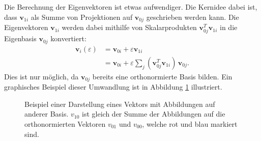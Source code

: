 Die Berechnung der Eigenvektoren ist etwas aufwendiger.
Die Kernidee dabei ist, dass $\bm v_{1i}$ als Summe von Projektionen auf $\bm v_{0j}$ geschrieben werden kann.
Die Eigenvektoren $\bm v_{1i}$ werden dabei mithilfe von Skalarprodukten $\bm v_{0j}^T \bm v_{1i}$ in die Eigenbasis $\bm v_{0j}$ konvertiert:
\begin{align}
    \bm v_i(\varepsilon)
    &=
    \bm v_{0i} + \varepsilon \bm v_{1i} \\
    &=
    \bm v_{0i} + \varepsilon \sum_{j} \left( \bm v_{0j}^T \bm v_{1i} \right) \, \bm v_{0j}.
\end{align}
Dies ist nur möglich, da $\bm v_{0j}$ bereits eine orthonormierte Basis bilden.
Ein graphisches Beispiel dieser Umwandlung ist in Abbildung \ref{ew:fig:scalar_prod} illustriert.
\begin{figure}
    \begin{center}
        
    \end{center}
    \caption[Eigenräume]{
        Beispiel einer Darstellung eines Vektors mit Abbildungen auf anderer Basis.
        $v_{10}$ ist gleich der Summe der Abbildungen auf die orthonormierten Vektoren $v_{01}$ und $v_{00}$, welche rot und blau markiert sind.
    } \label{ew:fig:scalar_prod}
\end{figure}

